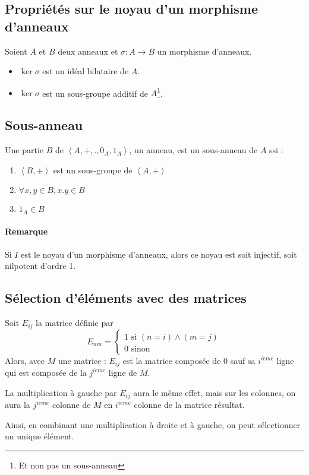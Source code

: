 \documentclass[a4paper,10pt]{article}
\newcommand{\ap}{ \rightarrow} %
\newcommand{\grp}[1]{\left\langle #1 \right\rangle} %
\newcommand{\mfootnote}[1]{\up{(}\footnote{#1}\up{)}}
\begin{document}
 \subsection{Propriétés sur le noyau d'un morphisme d'anneaux}
  Soient $A$ et $B$ deux anneaux et $\sigma: A \ap B$ un morphisme d'anneaux.
  \begin{itemize}
   \item $\ker{\sigma}$ est un idéal bilataire de $A$.
   \item $\ker{\sigma}$ est un sous-groupe additif de $A$\mfootnote{Et non pas un sous-anneau}.
  \end{itemize}

 \subsection{Sous-anneau}
  Une partie $B$ de $\grp{A,+,.,0_A,1_A}$, un anneau,
  est un sous-anneau de $A$ ssi : 
  \begin{enumerate}
   \item $\grp{B, +}$ est un sous-groupe de $\grp{A,+}$
   \item $\forall x,y \in B, x.y \in B$
   \item $1_A \in B$
  \end{enumerate}


  \paragraph{Remarque} Si $I$ est le noyau d'un morphisme d'anneaux, alors ce noyau est soit injectif, soit nilpotent d'ordre 1.

 \subsection{Sélection d'éléments avec des matrices}
  Soit $E_{ij}$ la matrice définie par 
  $$E_{nm}=
  \begin{cases}
   1 \mbox{ si }(n=i) \land (m=j)\\
   0 \mbox{ sinon}
  \end{cases}$$
  Alors, avec $M$ une matrice : $E_{ij}$ est la matrice composée de $0$ sauf sa $i^{ieme}$ ligne qui est composée de la $j^{ieme}$ ligne de $M$.

  La multiplication à gauche par $E_{ij}$ aura le même effet, mais sur les colonnes, on aura la $j^{ieme}$ colonne de $M$ en $i^{ieme}$ colonne de la matrice résultat.

  Ainsi, en combinant une multiplication à droite et à gauche, on peut sélectionner un unique élément.
\end{document}
